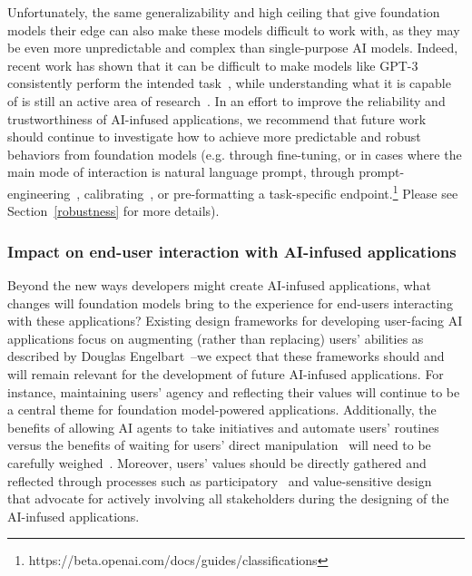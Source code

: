 Unfortunately, the same generalizability and high ceiling that give foundation models their edge can also make these models difficult to work with, as they may be even more unpredictable and complex than single-purpose AI models. Indeed, recent work has shown that it can be difficult to make models like GPT-3 consistently perform the intended task~\citep{Reynolds2021prompt}, while understanding what it is capable of is still an active area of research~\citep{Hendrycks2020Measuring}. In an effort to improve the reliability and trustworthiness of AI-infused applications, we recommend that future work should continue to investigate how to achieve more predictable and robust behaviors from foundation models (e.g. through fine-tuning, or in cases where the main mode of interaction is natural language prompt, through prompt-engineering~\citep{Reynolds2021prompt, Liu2021incontext}, calibrating~\citep{Zhao2021calibrate}, or pre-formatting a task-specific endpoint.\footnote{https://beta.openai.com/docs/guides/classifications} Please see Section~\ref{robustness} for more details). 

\subsubsection{Impact on end-user interaction with AI-infused applications} 
\label{sec:interaction-userimpact}
Beyond the new ways developers might create AI-infused applications, what changes will foundation models bring to the experience for end-users interacting with these applications? Existing design frameworks for developing user-facing AI applications focus on augmenting (rather than replacing) users' abilities as described by Douglas Engelbart~\citep{Engelbart1963augment}--we expect that these frameworks should and will remain relevant for the development of future AI-infused applications. For instance, maintaining users' agency and reflecting their values will continue to be a central theme for foundation model-powered applications. Additionally, the benefits of allowing AI agents to take initiatives and automate users' routines versus the benefits of waiting for users' direct manipulation~\citep{Shneiderman1997direct} will need to be carefully weighed~\citep{Horvitz1999mixedinit}. Moreover, users' values should be directly gathered and reflected through processes such as participatory~\citep{Lee2019} and value-sensitive design~\citep{smith2020keeping} that advocate for actively involving all stakeholders during the designing of the AI-infused applications. 

